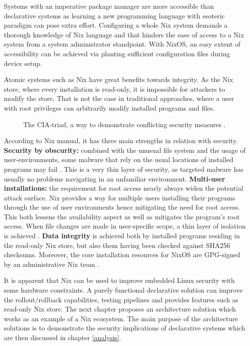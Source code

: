 Systems with an imperative package manager are more accessible than
declarative systems as learning a new programming language with
esoteric paradigm can pose extra effort. Configuring a whole Nix
system demands a thorough knowledge of Nix language and that
hinders the ease of access to a Nix system from a system
administrator standpoint. With NixOS, an easy extent of accessibility
can be achieved via planting sufficient configuration files during
device setup.

Atomic systems such as Nix have great benefits towards integrity. As
the Nix store, where every installation is read-only,
it is impossible for attackers to modify the store. That is not the
case in traditional approaches, where a user with root privileges can arbitrarily modify installed
programs and files.

\begin{figure}[t!]
\centerline{}
\caption[The CIA-triad.]{The CIA-triad, a way to demonstrate conflicting security
  measures \cite{hughes2013quantitative}.}
\label{ciatriad}
\end{figure}

According to Nix manual, it has three main strengths in relation with
security. \textbf{Security by obscurity: }combined with the unusual
file system and the usage of user-environments, some malware that rely
on the usual locations of installed programs may fail
\cite{nixosSecurityNixOS}. This is a very thin layer of security, as
targeted malware has usually no problems navigating in an unfamiliar
environment. \textbf{Multi-user installations: }the requirement for
root access nearly always widen the potential attack surface. Nix
provides a way for multiple users installing their programs through
the use of user environments hence mitigating the need for root
access. This both lessens the availability aspect as well as
mitigates the program's root access. When file changes are made in
user-specific scope, a thin layer of isolation is achieved
\cite{nixosNixOSManual}. \textbf{Data integrity} is achieved both by
installed programs residing in the read-only Nix store, but also them
having been checked against SHA256 checksums. Moreover, the core
installation resources for NixOS are GPG-signed by an administrative
Nix team \cite{nixosSecurityNixOS}.

It is apparent that Nix can be used to improve embedded Linux security
with some hardware constraints. A purely functional declarative
solution can improve the rollout/rollback capabilities, testing
pipelines and provides features such as read-only Nix store. The next
chapter proposes an architecture solution which works as an example of
a Nix ecosystem. The main purpose of the architecture solutions is to
demonstrate the security implications of declarative systems which are then discussed 
in chapter \ref{analysis}. 
